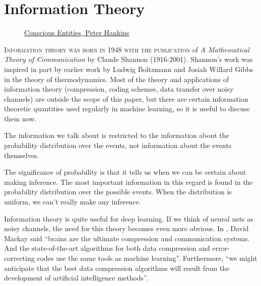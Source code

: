 \section{Information Theory}
\label{sec:information-theory}

\vspace{1cm}

\begin{figure}[h]
  \label{fig:info}
  \centering
  \caption{\href{https://www.consciousentities.com/2017/02/consciousness-entropy/}{Conscious
      Entities, Peter Hankins}}
\end{figure}

\vspace{1cm}

\lettrine[lines=3]{\Royal I} {nformation theory was born in 1948 with
  the publication} of \textit{A Mathematical Theory of Communication}
by Claude Shannon (1916-2001). Shannon's work was inspired in part by
earlier work by Ludwig Boltzmann and Josiah Willard Gibbs in the
theory of thermodynamics. Most of the theory and applications of
information theory (compression, coding schemes, data transfer over
noisy channels) are outside the scope of this paper, but there are
certain information theoretic quantities used regularly in machine
learning, so it is useful to discuss them now.

\begin{remark}
  The information we talk about is restricted to the information about
  the probability distribution over the events, not information about
  the events themselves.

  The significance of probability is that it tells us when we can be
  certain about making inference. The most important information in
  this regard is found in the probability distribution over the
  possible events. When the distribution is uniform, we can't really
  make any inference.
\end{remark}

Information theory is quite useful for deep learning. If we think of
neural nets as noisy channels, the need for this theory becomes even
more obvious. In \cite{ref:mackay-2003}, David Mackay said ``brains
are the ultimate compression and communication systems. And the
state-of-the-art algorithms for both data compression and
error-correcting codes use the same tools as machine
learning''. Furthermore, ``we might anticipate that the best data
compression algorithms will result from the development of artificial
intelligence methods''.

